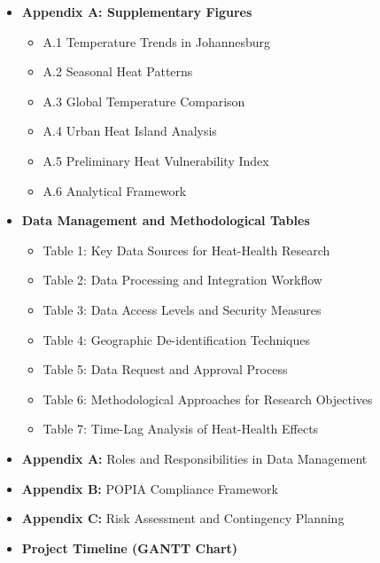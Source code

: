 \documentclass[12pt,a4paper]{article}
\begin{document}
\begin{itemize}[leftmargin=*, itemsep=0.5em]
    \item \textbf{Appendix A: Supplementary Figures}
    \begin{itemize}[leftmargin=*, itemsep=0.3em]
        \item A.1 Temperature Trends in Johannesburg
        \item A.2 Seasonal Heat Patterns
        \item A.3 Global Temperature Comparison
        \item A.4 Urban Heat Island Analysis
        \item A.5 Preliminary Heat Vulnerability Index
        \item A.6 Analytical Framework
    \end{itemize}
    
    \item \textbf{Data Management and Methodological Tables}
    \begin{itemize}[leftmargin=*, itemsep=0.3em]
        \item Table 1: Key Data Sources for Heat-Health Research
        \item Table 2: Data Processing and Integration Workflow
        \item Table 3: Data Access Levels and Security Measures
        \item Table 4: Geographic De-identification Techniques
        \item Table 5: Data Request and Approval Process
        \item Table 6: Methodological Approaches for Research Objectives
        \item Table 7: Time-Lag Analysis of Heat-Health Effects
    \end{itemize}
    
    \item \textbf{Appendix A:} Roles and Responsibilities in Data Management
    \item \textbf{Appendix B:} POPIA Compliance Framework
    \item \textbf{Appendix C:} Risk Assessment and Contingency Planning
    \item \textbf{Project Timeline (GANTT Chart)}
\end{itemize}
\end{document}
